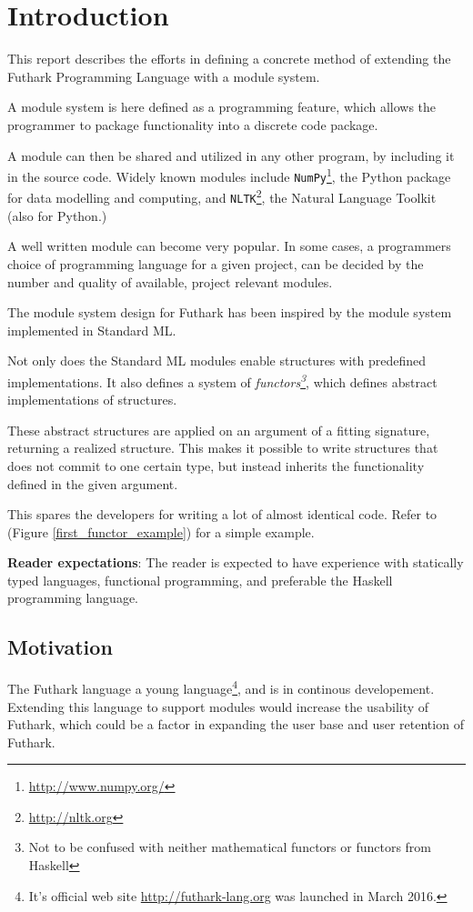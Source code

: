 \section{Introduction}
\label{sec:introduction}
This report describes the efforts in defining a concrete method of extending the Futhark Programming Language with a module system.

A module system is here defined as a programming feature, which allows the programmer to package functionality into a discrete code package.

A module can then be shared and utilized in any other program, by including it in the source code. Widely known modules include \texttt{NumPy}\footnote{\url{http://www.numpy.org/}}, the Python package for
data modelling and computing, and \texttt{NLTK}\footnote{\url{http://nltk.org}},
the Natural Language Toolkit (also for Python.)


A well written module can become very popular. In some cases, a programmers choice of programming language for a given project, can be decided by the number and quality of available, project relevant modules.


The module system design for Futhark has been inspired by the module system implemented in Standard ML\cite{crash_course}. 

Not only does the Standard ML modules enable structures with predefined implementations. It also defines a system of \textit{functors\footnote{Not to be confused with neither mathematical functors or functors from Haskell}}, which defines abstract implementations of structures.


These abstract structures are applied on an argument of a fitting signature, returning a realized structure. This makes it possible to write structures that does not commit to one certain type, but instead inherits the functionality defined in the given argument.


This spares the developers for writing a lot of almost identical code. Refer to (Figure \ref{first_functor_example}) for a simple example.


\textbf{Reader expectations}:
The reader is expected to have experience with statically typed languages, functional programming, and preferable the Haskell programming language.
\pagebreak
\subsection{Motivation}
\label{subsec:label}
The Futhark language a young language\footnote{It's official web site \url{http://futhark-lang.org} was launched in March 2016.}, and is in continous developement. Extending this language to support modules would increase the usability of Futhark, which could be a factor in expanding the user base and user retention
of Futhark.


